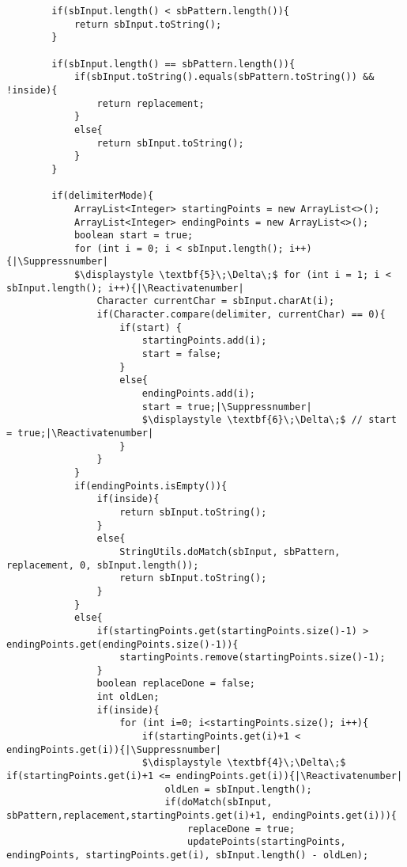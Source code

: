 \documentclass{article}
\makeatletter
\let\origthelstnumber\thelstnumber
\newcommand*\Suppressnumber{%
  \lst@AddToHook{OnNewLine}{%
    \let\thelstnumber\relax%
     \advance\c@lstnumber-\@ne\relax%
    }%
}
\newcommand*\Reactivatenumber{%
  \lst@AddToHook{OnNewLine}{%
   \let\thelstnumber\origthelstnumber%
   \advance\c@lstnumber\@ne\relax}%
}
\makeatother
\begin{document}
\begin{lstlisting}
        if(sbInput.length() < sbPattern.length()){
            return sbInput.toString();
        }

        if(sbInput.length() == sbPattern.length()){
            if(sbInput.toString().equals(sbPattern.toString()) && !inside){
                return replacement;
            }
            else{
                return sbInput.toString();
            }
        }

        if(delimiterMode){
            ArrayList<Integer> startingPoints = new ArrayList<>();
            ArrayList<Integer> endingPoints = new ArrayList<>();
            boolean start = true;
            for (int i = 0; i < sbInput.length(); i++){|\Suppressnumber|
            $\displaystyle \textbf{5}\;\Delta\;$ for (int i = 1; i < sbInput.length(); i++){|\Reactivatenumber|
                Character currentChar = sbInput.charAt(i);
                if(Character.compare(delimiter, currentChar) == 0){
                    if(start) {
                        startingPoints.add(i);
                        start = false;
                    }
                    else{
                        endingPoints.add(i);
                        start = true;|\Suppressnumber|
                        $\displaystyle \textbf{6}\;\Delta\;$ // start = true;|\Reactivatenumber|
                    }
                }
            }
            if(endingPoints.isEmpty()){
                if(inside){
                    return sbInput.toString();
                }
                else{
                    StringUtils.doMatch(sbInput, sbPattern, replacement, 0, sbInput.length());
                    return sbInput.toString();
                }
            }
            else{
                if(startingPoints.get(startingPoints.size()-1) > endingPoints.get(endingPoints.size()-1)){
                    startingPoints.remove(startingPoints.size()-1);
                }
                boolean replaceDone = false;
                int oldLen;
                if(inside){
                    for (int i=0; i<startingPoints.size(); i++){
                        if(startingPoints.get(i)+1 < endingPoints.get(i)){|\Suppressnumber|
                        $\displaystyle \textbf{4}\;\Delta\;$ if(startingPoints.get(i)+1 <= endingPoints.get(i)){|\Reactivatenumber|
                            oldLen = sbInput.length();
                            if(doMatch(sbInput, sbPattern,replacement,startingPoints.get(i)+1, endingPoints.get(i))){
                                replaceDone = true;
                                updatePoints(startingPoints, endingPoints, startingPoints.get(i), sbInput.length() - oldLen);

\end{lstlisting}
\end{document}
